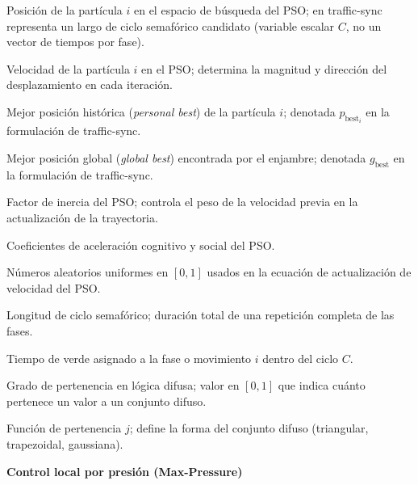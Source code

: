 \vspace{0.3cm}

\begin{description}[leftmargin=3cm, style=sameline, font=\normalfont]
  \item[$x_i$]       Posición de la partícula $i$ en el espacio de búsqueda del PSO;
                     en traffic-sync representa un largo de ciclo semafórico candidato
                     (variable escalar $C$, no un vector de tiempos por fase).
  \item[$v_i$]       Velocidad de la partícula $i$ en el PSO; determina la magnitud y
                     dirección del desplazamiento en cada iteración.
  \item[$p_i$]       Mejor posición histórica (\textit{personal best}) de la partícula $i$;
                     denotada $p_{\text{best}_i}$ en la formulación de traffic-sync.
  \item[$g$]         Mejor posición global (\textit{global best}) encontrada por el enjambre;
                     denotada $g_{\text{best}}$ en la formulación de traffic-sync.
  \item[$w$]         Factor de inercia del PSO; controla el peso de la velocidad previa en
                     la actualización de la trayectoria.
  \item[$c_1, c_2$]  Coeficientes de aceleración cognitivo y social del PSO.
  \item[$r_1, r_2$]  Números aleatorios uniformes en $[0,1]$ usados en la ecuación de
                     actualización de velocidad del PSO.
  \item[$C$]         Longitud de ciclo semafórico; duración total de una repetición completa
                     de las fases.
  \item[$g_i$]       Tiempo de verde asignado a la fase o movimiento $i$ dentro del ciclo $C$.
  \item[$\mu$]       Grado de pertenencia en lógica difusa; valor en $[0,1]$ que indica
                     cuánto pertenece un valor a un conjunto difuso.
  \item[$\phi_j$]    Función de pertenencia $j$; define la forma del conjunto difuso
                     (triangular, trapezoidal, gaussiana).
\end{description}

\vspace{0.8cm}
\noindent\textbf{Control local por presión (Max-Pressure)}

\vspace{0.3cm}

